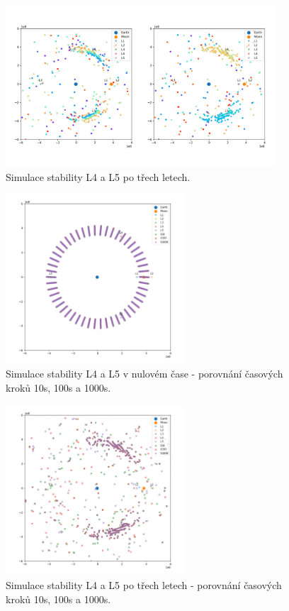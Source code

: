 \documentclass[a4paper,11pt]{article}
\begin{document}
\begin{figure}[h!]
    \centering
    \includegraphics[width=0.9\textwidth]{lagrange-25ring-t3yr.png}

    \caption{Simulace stability L4 a L5 po třech letech.}
    \label{fig:lagrange-25ring-t3yr}
\end{figure}

\begin{figure}[h!]
    \centering
    \includegraphics[width=0.6\textwidth]{lagrange-25ring-comp-t0.png}

    \caption{Simulace stability L4 a L5 v nulovém čase - porovnání časových kroků 10s, 100s a 1000s.}
    \label{fig:lagrange-25ring-comp-t0}
\end{figure}

\begin{figure}[h!]
    \centering
    \includegraphics[width=0.6\textwidth]{lagrange-25ring-comp-t3yr.png}

    \caption{Simulace stability L4 a L5 po třech letech - porovnání časových kroků 10s, 100s a 1000s.}
    \label{fig:lagrange-25ring-comp-t3yr}
\end{figure}
\end{document}
